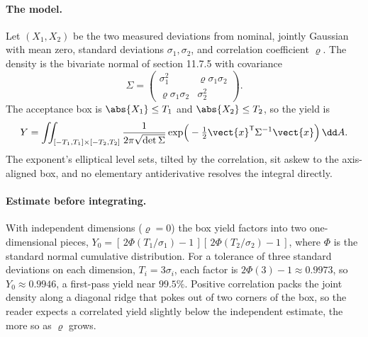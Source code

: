 \paragraph{The model.} Let $(X_{1}, X_{2})$ be the two measured
deviations from nominal, jointly Gaussian with mean zero, standard
deviations $\sigma_{1}, \sigma_{2}$, and correlation coefficient
$\varrho$. The density is the bivariate normal of section 11.7.5 with
covariance
\[
\Sigma = \begin{pmatrix} \sigma_{1}^{2} & \varrho\sigma_{1}\sigma_{2}
\\ \varrho\sigma_{1}\sigma_{2} & \sigma_{2}^{2} \end{pmatrix}.
\]
The acceptance box is $\abs{X_{1}} \leq T_{1}$ and $\abs{X_{2}} \leq
T_{2}$, so the yield is
\[
Y = \iint_{[-T_{1}, T_{1}]\times[-T_{2}, T_{2}]}
\frac{1}{2\pi\sqrt{\det\Sigma}}
\exp\!\Big(-\tfrac{1}{2}\vect{x}^{\mathsf{T}}\Sigma^{-1}\vect{x}\Big)
\,\dd A.
\]
The exponent's elliptical level sets, tilted by the correlation, sit
askew to the axis-aligned box, and no elementary antiderivative resolves
the integral directly.

\paragraph{Estimate before integrating.} With independent dimensions
($\varrho = 0$) the box yield factors into two one-dimensional pieces,
$Y_{0} = [\,2\Phi(T_{1}/\sigma_{1}) - 1\,][\,2\Phi(T_{2}/\sigma_{2}) - 1
\,]$, where $\Phi$ is the standard normal cumulative distribution. For a
tolerance of three standard deviations on each dimension,
$T_{i} = 3\sigma_{i}$, each factor is $2\Phi(3) - 1 \approx 0.9973$, so
$Y_{0} \approx 0.9946$, a first-pass yield near $99.5\%$. Positive
correlation packs the joint density along a diagonal ridge that pokes out
of two corners of the box, so the reader expects a correlated yield
slightly below the independent estimate, the more so as $\varrho$ grows.

